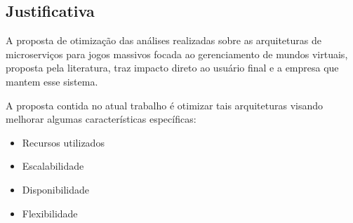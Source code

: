 \subsection{Justificativa}

A proposta de otimização das análises realizadas sobre as arquiteturas de microserviços para jogos massivos focada ao gerenciamento de mundos virtuais, proposta pela literatura, traz impacto direto ao usuário final e a empresa que mantem esse sistema\cite{1417630}.

A proposta contida no atual trabalho é otimizar tais arquiteturas visando melhorar algumas características específicas:

\begin{itemize}
  \item Recursos utilizados
  \item Escalabilidade
  \item Disponibilidade
  \item Flexibilidade
\end{itemize}
